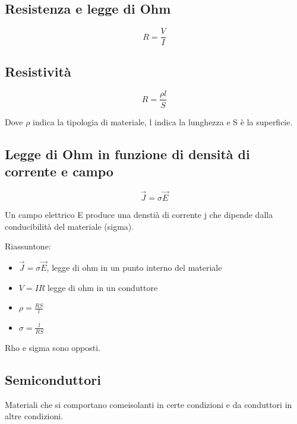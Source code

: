  \subsection{Resistenza e legge di Ohm}
 \begin{equation*}
     R = \frac{V}{I}
 \end{equation*}

 \subsection{Resistività}
 \begin{equation*}
     R = \frac{\rho l}{S}
 \end{equation*}

 Dove $\rho$ indica la tipologia di materiale, l indica la lunghezza e S è la superficie.

 \subsection{Legge di Ohm in funzione di densità di corrente e campo}
\begin{equation*}
    \vec{J} = \sigma \vec{E}
\end{equation*}

Un campo elettrico E produce una denstià di corrente j che dipende dalla 
conducibilità del materiale (sigma).

Riassuntone:
\begin{itemize}
    \item $\vec{J} = \sigma\vec{E}$, legge di ohm in un punto interno del materiale
    \item $V = IR$ legge di ohm in un conduttore
    \item $\rho = \frac{RS}{l}$
    \item $\sigma = \frac{l}{RS}$
\end{itemize}
Rho e sigma sono opposti.

\subsection{Semiconduttori}
Materiali che si comportano comeisolanti in certe condizioni e da conduttori
in altre condizioni.
